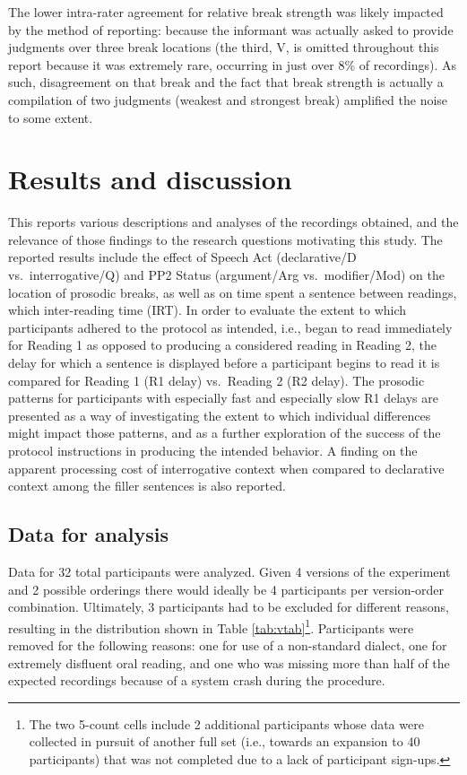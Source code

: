 \documentclass[12pt,oneside]{book}
\let\rmarkdownfootnote\footnote%
\def\footnote{\protect\rmarkdownfootnote}
\begin{document}
The lower intra-rater agreement for relative break strength was likely impacted by the method of reporting: because the informant was actually asked to provide judgments over three break locations (the third, V, is omitted throughout this report because it was extremely rare, occurring in just over 8\% of recordings). As such, disagreement on that break and the fact that break strength is actually a compilation of two judgments (weakest and strongest break) amplified the noise to some extent.

\hypertarget{res}{%
\chapter{Results and discussion}\label{res}}

This  reports various descriptions and analyses of the recordings obtained, and the relevance of those findings to the research questions motivating this study. The reported results include the effect of Speech Act (declarative/D vs.~interrogative/Q) and PP2 Status (argument/Arg vs.~modifier/Mod) on the location of prosodic breaks, as well as on time spent    a sentence between readings, which  inter-reading time (IRT). In order to evaluate the extent to which participants adhered to the protocol as intended, i.e., began to read immediately for Reading 1 as opposed to producing a considered reading in Reading 2, the delay for which a sentence is displayed before a participant begins to read it is compared for Reading 1 (R1 delay) vs.~Reading 2 (R2 delay). The prosodic patterns for participants with especially fast and especially slow R1 delays are presented as a way of investigating the extent to which individual differences might impact those patterns, and as a further exploration of the success of the protocol instructions in producing the intended behavior. A finding on the apparent processing cost of interrogative context when compared to declarative context among the filler sentences is also reported.

\hypertarget{data}{%
\section{Data for analysis}\label{data}}

Data for 32 total participants were analyzed. Given 4 versions of the experiment and 2 possible orderings there would ideally be 4 participants per version-order combination. Ultimately, 3 participants had to be excluded for different reasons, resulting in the distribution  shown in Table \ref{tab:vtab}\footnote{The two 5-count cells include 2 additional participants whose data were collected in pursuit of another full set (i.e., towards an expansion to 40 participants) that was not completed due to a lack of participant sign-ups.}. Participants were removed for the following reasons: one for use of a non-standard dialect, one for extremely disfluent oral reading, and one who was missing more than half of the expected recordings because of a system crash during the procedure.
\end{document}
